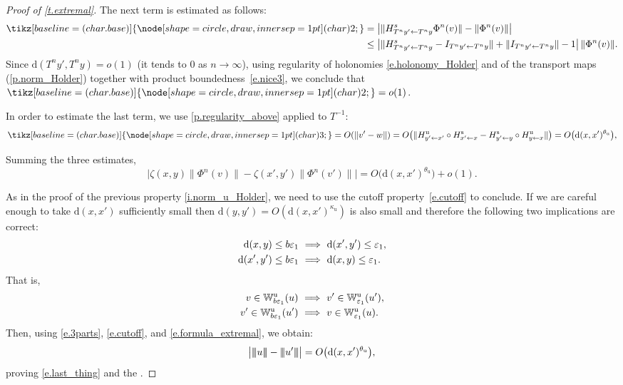 \documentclass[JEP,XML,SOM,Unicode]{cedram}
\newcommand\implique{\mathchoice{\Longrightarrow}{\Rightarrow}{\Rightarrow}{\Rightarrow}}
\theoremstyle{plain}
\theoremstyle{definition}
\newcommand{\tribar}[1]{\mathopen{| {\kern -1.5pt} | {\kern -1.5pt} |} {#1}
\mathclose{| {\kern -1.5pt} | {\kern -1.5pt} |}}
\newcommand{\WW}{\mathbb{W}}
\newcommand*\circled[1]{\tikz[baseline=(char.base)]{
\node[shape=circle,draw,inner sep=1pt] (char) {\footnotesize{#1}};}}
\newcommand{\dd}{\mathrm{d}}
\newcommand{\uu}{\mathrm{u}}
\renewcommand{\ss}{\mathrm{s}}
\let\epsilon\varepsilon
\begin{document}
\begin{proof}[Proof of \cref{t.extremal}]
The next term is estimated as follows:
\begin{align*}
\circled{2}
&= \left| \| H^s_{T^n y' \gets T^n y} \Phi^n (v) \| - \| \Phi^n (v) \| \right | \\
&\le \left| \| H^s_{T^n y' \gets T^n y} - I_{T^n y' \gets T^n y}\| + \|I_{T^n y' \gets T^n y} \| - 1 \right| \|\Phi^n(v)\|.
\end{align*}
Since $\dd(T^n y', T^n y) = o(1)$ (\ie it tends to $0$ as $n \to \infty$), using regularity of holonomies \eqref{e.holonomy_Holder} and of the transport maps (\cref{p.norm_Holder}) together with product boundedness~\eqref{e.nice3}, we conclude that $\circled{2} = o(1)$.

In order to estimate the last term, we use \cref{p.regularity_above} applied to $ T^{-1} $:
\[
\circled{3} = O(\| v' - w \|)
= O\big( \| H^\uu_{y'\gets x'} \circ H^\ss_{x' \gets x} - H^\ss_{y' \gets y} \circ H^\uu_{y \gets x} \| \big)
= O\big( \dd(x,x')^{\theta_\uu} \big),
\]

Summing the three estimates,
\begin{equation}\label{e.3parts}
\big| \zeta(x,y) \|\Phi^n (v)\| - \zeta(x',y') \|\Phi^n (v')\| \big| =
O \big( \dd(x,x')^{\theta_\uu} \big) + o(1).
\end{equation}

As in the proof of the previous property \eqref{i.norm_u_Holder}, we need to use the cutoff property~\eqref{e.cutoff} to conclude.
If we are careful enough to take $\dd(x,x')$ sufficiently small then $\dd(y,y') = O(\dd(x,x')^{\kappa_\uu})$ is also small and therefore the following two implications are correct:
\begin{align*}
	\dd(x,y) \le b \epsilon_1 \ &\implique \ \dd(x',y') \le \epsilon_1, \\
	\dd(x',y') \le b \epsilon_1 \ &\implique \ \dd(x,y) \le \epsilon_1.
\end{align*}
That is,
\begin{align*}
	v \in \WW^\uu_{b \epsilon_1}(u) \ &\implique \ v' \in \WW^\uu_{\epsilon_1}(u'), \\
	v' \in \WW^\uu_{b \epsilon_1}(u') \ &\implique \ v \in \WW^\uu_{\epsilon_1}(u).
\end{align*}
Then, using \eqref{e.3parts}, \eqref{e.cutoff}, and \eqref{e.formula_extremal}, we obtain:
\[
\big| \tribar{u} - \tribar{u'} \big| = O \big( \dd(x,x')^{\theta_\uu} \big),
\]
proving \eqref{e.last_thing} and the .
\end{proof}
\end{document}
